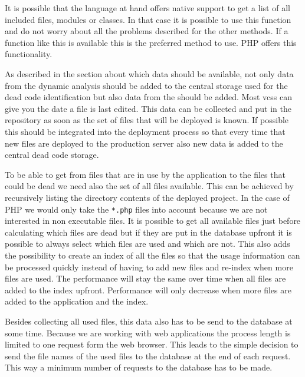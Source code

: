 It is possible that the language at hand offers native support to get a list of all included files, modules or classes. In that case it is possible to use this function and do not worry about all the problems described for the other methods. If a function like this is available this is the preferred method to use. PHP offers this functionality.

As described in the section about which data should be available, not only data from the dynamic analysis should be added to the central storage used for the dead code identification but also data from the \vcs should be added. Most \glspl{vcs} can give you the date a file is last edited. This data can be collected and put in the repository as soon as the set of files that will be deployed is known. If possible this should be integrated into the deployment process so that every time that new files are deployed to the production server also new \vcs data is added to the central dead code storage.

To be able to get from files that are in use by the application to the files that could be dead we need also the set of all files available. This can be achieved by recursively listing the directory contents of the deployed project. In the case of PHP we would only take the \verb|*.php| files into account because we are not interested in non executable files. It is possible to get all available files just before calculating which files are dead but if they are put in the database upfront it is possible to always select which files are used and which are not. This also adds the possibility to create an index of all the files so that the usage information can be processed quickly instead of having to add new files and re-index when more files are used. The performance will stay the same over time when all files are added to the index upfront. Performance will only decrease when more files are added to the application and the index.

Besides collecting all used files, this data also has to be send to the database at some time. Because we are working with web applications the process length is limited to one request form the web browser.   
This leads to the simple decision to send the file names of the used files to the database at the end of each request. This way a minimum number of requests to the database has to be made. 



